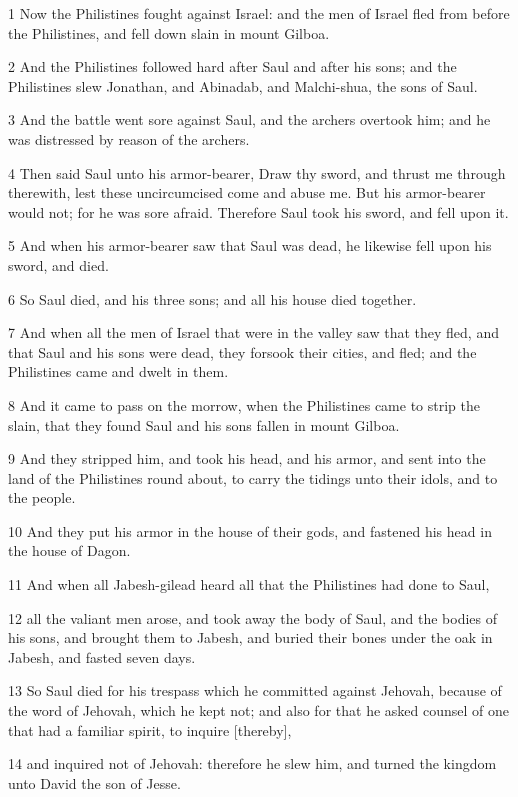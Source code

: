 \par 1 Now the Philistines fought against Israel: and the men of Israel fled from before the Philistines, and fell down slain in mount Gilboa.
\par 2 And the Philistines followed hard after Saul and after his sons; and the Philistines slew Jonathan, and Abinadab, and Malchi-shua, the sons of Saul.
\par 3 And the battle went sore against Saul, and the archers overtook him; and he was distressed by reason of the archers.
\par 4 Then said Saul unto his armor-bearer, Draw thy sword, and thrust me through therewith, lest these uncircumcised come and abuse me. But his armor-bearer would not; for he was sore afraid. Therefore Saul took his sword, and fell upon it.
\par 5 And when his armor-bearer saw that Saul was dead, he likewise fell upon his sword, and died.
\par 6 So Saul died, and his three sons; and all his house died together.
\par 7 And when all the men of Israel that were in the valley saw that they fled, and that Saul and his sons were dead, they forsook their cities, and fled; and the Philistines came and dwelt in them.
\par 8 And it came to pass on the morrow, when the Philistines came to strip the slain, that they found Saul and his sons fallen in mount Gilboa.
\par 9 And they stripped him, and took his head, and his armor, and sent into the land of the Philistines round about, to carry the tidings unto their idols, and to the people.
\par 10 And they put his armor in the house of their gods, and fastened his head in the house of Dagon.
\par 11 And when all Jabesh-gilead heard all that the Philistines had done to Saul,
\par 12 all the valiant men arose, and took away the body of Saul, and the bodies of his sons, and brought them to Jabesh, and buried their bones under the oak in Jabesh, and fasted seven days.
\par 13 So Saul died for his trespass which he committed against Jehovah, because of the word of Jehovah, which he kept not; and also for that he asked counsel of one that had a familiar spirit, to inquire [thereby],
\par 14 and inquired not of Jehovah: therefore he slew him, and turned the kingdom unto David the son of Jesse.


